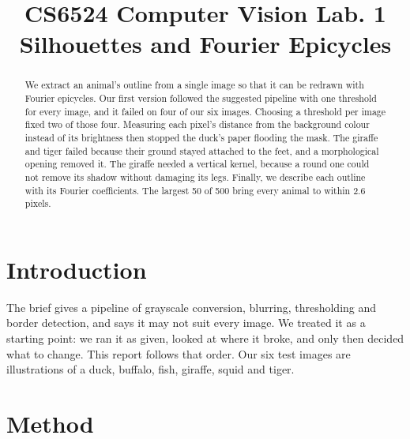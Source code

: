 \documentclass[conference]{IEEEtran}
\begin{document}
\title{CS6524 Computer Vision Lab. 1\\ Silhouettes and Fourier Epicycles}

\author{
\and
{}
\and
{}
}

\maketitle

\begin{abstract}
We extract an animal's outline from a single image so that it can be redrawn with Fourier epicycles. Our first version followed the suggested pipeline with one threshold for every image, and it failed on four of our six images. Choosing a threshold per image fixed two of those four. Measuring each pixel's distance from the background colour instead of its brightness then stopped the duck's paper flooding the mask. The giraffe and tiger failed because their ground stayed attached to the feet, and a morphological opening removed it. The giraffe needed a vertical kernel, because a round one could not remove its shadow without damaging its legs. Finally, we describe each outline with its Fourier coefficients. The largest 50 of 500 bring every animal to within 2.6 pixels.
\end{abstract}

\section{Introduction}
The brief gives a pipeline of grayscale conversion, blurring, thresholding and border detection, and says it may not suit every image. We treated it as a starting point: we ran it as given, looked at where it broke, and only then decided what to change. This report follows that order. Our six test images are illustrations of a duck, buffalo, fish, giraffe, squid and tiger.

\section{Method}
\end{document}

